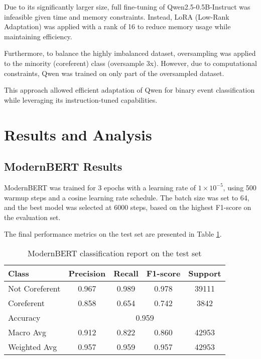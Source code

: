 \documentclass[12pt,a4paper]{article}
\begin{document}
Due to its significantly larger size, full fine-tuning of Qwen2.5-0.5B-Instruct was infeasible given time and memory constraints. Instead, LoRA (Low-Rank Adaptation) was applied with a rank of 16 to reduce memory usage while maintaining efficiency.

Furthermore, to balance the highly imbalanced dataset, oversampling was applied to the minority (coreferent) class (oversample 3x). However, due to computational constraints, Qwen was trained on only part of the oversampled dataset.

This approach allowed efficient adaptation of Qwen for binary event classification while leveraging its instruction-tuned capabilities.

\section{Results and Analysis}

\subsection{ModernBERT Results}

ModernBERT was trained for 3 epochs with a learning rate of $1 \times 10^{-5}$, using 500 warmup steps and a cosine learning rate schedule. The batch size was set to 64, and the best model was selected at 6000 steps, based on the highest F1-score on the evaluation set.

The final performance metrics on the test set are presented in Table \ref{tab:modernbert_results}.

\begin{table}[h]
    \centering
    \begin{tabular}{|l|c|c|c|c|}
        \hline
        Class & Precision & Recall & F1-score & Support \\
        \hline
        Not Coreferent & 0.967 & 0.989 & 0.978 & 39111 \\
        Coreferent & 0.858 & 0.654 & 0.742 & 3842 \\
        \hline
        Accuracy & \multicolumn{4}{c|}{0.959} \\
        Macro Avg & 0.912 & 0.822 & 0.860 & 42953 \\
        Weighted Avg & 0.957 & 0.959 & 0.957 & 42953 \\
        \hline
    \end{tabular}
    \caption{ModernBERT classification report on the test set}
    \label{tab:modernbert_results}
\end{table}
\end{document}
